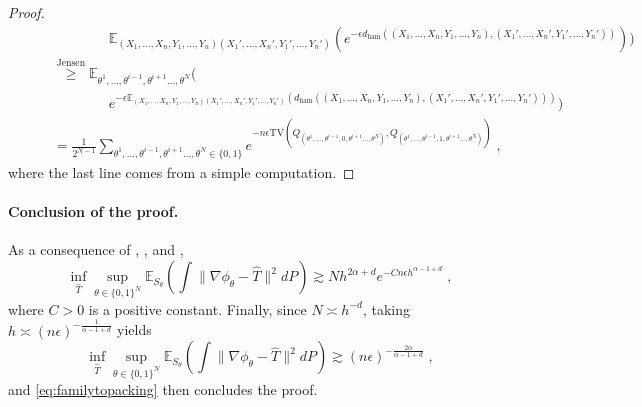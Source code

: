 \documentclass{article}
\theoremstyle{plain}
\theoremstyle{definition}
\theoremstyle{remark}
\newcommand{\E}[0]{\mathbb{E}}
\newcommand\tv[2]{\mathrm{TV}\left( {#1}, {#2} \right)}
\newcommand\ham[2]{d_\mathrm{ham}\left( {#1}, {#2} \right)}
\newcommand\p[1]{\left( {#1}\right)}
\begin{document}
\begin{proof}
\begin{equation}
\begin{aligned}
            &\quad\quad\quad\quad\quad\quad\E_{{(X_1, \dots, X_n, Y_1, \dots, Y_n)}{(X_1', \dots, X_n', Y_1', \dots, Y_n')}} \p{e^{- \epsilon \ham{(X_1, \dots, X_n, Y_1, \dots, Y_n)}{(X_1', \dots, X_n', Y_1', \dots, Y_n')}}} \Bigg)\\
            &\quad\quad \stackrel{\text{Jensen}}{\geq}
            \E_{\theta^1, \dots, \theta^{i-1}, \theta^{i+1} \dots, \theta^{N}} \Bigg( \\
            &\quad\quad\quad\quad\quad\quad e^{- \epsilon  \E_{{(X_1, \dots, X_n, Y_1, \dots, Y_n)}{(X_1', \dots, X_n', Y_1', \dots, Y_n')}} \p{\ham{(X_1, \dots, X_n, Y_1, \dots, Y_n)}{(X_1', \dots, X_n', Y_1', \dots, Y_n')}}}\bigg) \\
            &\quad\quad =\frac{1}{2^{N-1}}\sum_{\theta^1, \dots, \theta^{i-1}, \theta^{i+1} \dots, \theta^{N} \in \{0, 1 \}} e^{- n \epsilon \tv{Q_{(\theta^1, \dots, \theta^{i-1}, 0, \theta^{i+1} \dots, \theta^{N})}}{Q_{(\theta^1, \dots, \theta^{i-1}, 1, \theta^{i+1} \dots, \theta^{N})}}} \;,
        \end{aligned}
    \end{equation}
    where the last line comes from a simple computation.
\end{proof}

    \paragraph{Conclusion of the proof.}

    As a consequence of , ,  and ,
    \begin{equation}
        \inf_{\hat{T}} \sup_{\theta \in \{0, 1 \}^{N}} \E_{S_{\theta}} \p{\int \| \nabla \phi_{\theta} - \hat{T}  \|^2 dP}
        \gtrsim N h^{2 \alpha + d} e^{- C n \epsilon h^{\alpha-1+d}} \;,
    \end{equation}
    where $C > 0$ is a positive constant.
    Finally, since $N \asymp h^{-d}$, taking $h \asymp (n \epsilon)^{- \frac{1}{\alpha - 1 + d}}$ yields
    \begin{equation}
        \inf_{\hat{T}} \sup_{\theta \in \{0, 1 \}^{N}} \E_{S_{\theta}} \p{\int \| \nabla \phi_{\theta} - \hat{T}  \|^2 dP}
        \gtrsim (n \epsilon)^{- \frac{2 \alpha}{\alpha - 1 + d}} \;,
    \end{equation}
and \eqref{eq:familytopacking} then concludes the proof.
\end{document}
